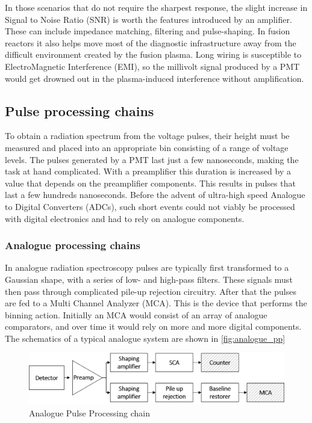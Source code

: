 In those scenarios that do not require the sharpest response,
the slight increase in Signal to Noise Ratio (SNR) is worth the 
features introduced by an amplifier. These can include
impedance matching, filtering and pulse-shaping.
In fusion reactors it also helps move most of the 
diagnostic infrastructure away from the difficult environment
created by the fusion plasma. 
Long wiring is susceptible to ElectroMagnetic Interference (EMI), 
so the millivolt signal produced by a PMT would 
get drowned out in the plasma-induced interference without amplification.

\subsection{Pulse processing chains}

To obtain a radiation spectrum from the voltage pulses,
their height must be measured and
placed into an appropriate bin consisting of a range of voltage levels.
The pulses generated by a PMT last just a few nanoseconds,
making the task at hand complicated.
With a preamplifier this duration is increased by a value
that depends on the preamplifier components.
This results in pulses that last a few hundreds nanoseconds.
Before the advent of ultra-high speed Analogue to Digital Converters (ADCs),
such short events could not viably be processed with digital 
electronics and had to rely on analogue components.

\subsubsection{Analogue processing chains}

In analogue radiation spectroscopy
pulses are typically first transformed to a Gaussian shape,
with a series of low- and high-pass filters.
These signals must then pass through complicated pile-up
rejection circuitry. After that the pulses 
are fed to a Multi Channel Analyzer (MCA).
This is the device that performs the binning action.
Initially an MCA would consist of an array of 
analogue comparators, and over time it would rely 
on more and more digital components.
The schematics of a typical analogue system are shown in \autoref{fig:analogue_pp}

\begin{figure}[H]
  \centering
  \includegraphics[width=\linewidth]{media/analog_pulse_processing.png}
  \caption{Analogue Pulse Processing chain}
  \label{fig:analogue_pp}
\end{figure}



